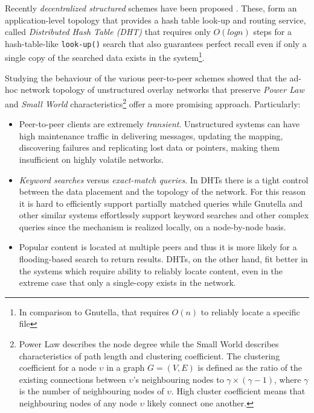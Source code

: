 \documentclass[a4paper,10pt]{article}
\begin{document}
Recently \emph{decentralized structured} schemes have been proposed \cite{ratnasamy_can_2001, stoica_chord_2001, zhao_tapestry_2001, antony_pastry_2001}. These, form an application-level topology that provides a hash table look-up and routing service, called \emph{Distributed Hash Table (DHT)} that requires only $O \left ( log n \right )$ steps for a hash-table-like \texttt{look-up()} search that also guarantees perfect recall even if only a single copy of the searched data exists in the system\footnote{In comparison to Gnutella, that requires $O \left ( n \right )$ to reliably locate a specific file}.

Studying the behaviour of the various peer-to-peer schemes \cite{matei_mapgnutella_2002, lv_randomwalks_2002, merugu_str2unstr_2003} showed that the ad-hoc network topology of unstructured overlay networks that preserve \emph{Power Law} and \emph{Small World} characteristics\footnote{Power Law describes the node degree while the Small World describes characteristics of path length and clustering coefficient. The clustering coefficient for a node $\upsilon$ in a graph $G = \left( V, E \right)$ is defined as the ratio of the existing connections between $\upsilon$'s neighbouring nodes to $\gamma \times \left( \gamma - 1 \right)$, where $\gamma$ is the number of neighbouring nodes of $\upsilon$. High cluster coefficient means that neighbouring nodes of any node $\upsilon$ likely connect one another.} \cite{faloutsos_powerlaw_1999, saroiu_measurefileshare_2002} offer a more promising approach. Particularly:
\begin{itemize}
  \item Peer-to-peer clients are extremely \emph{transient}. Unstructured systems can have high maintenance traffic in delivering messages, updating the mapping, discovering failures and replicating lost data or pointers, making them insufficient on highly volatile networks.
  \item \emph{Keyword searches} versus \emph{exact-match queries}. In DHTs there is a tight control between the data placement and the topology of the network. For this reason it is hard to efficiently support partially matched queries while Gnutella and other similar systems effortlessly support keyword searches and other complex queries since the mechanism is realized locally, on a node-by-node basis.
  \item Popular content is located at multiple peers and thus it is more likely for a flooding-based search to return results. DHTs, on the other hand, fit better in the systems which require ability to reliably locate content, even in the extreme case that only a single-copy exists in the network.
\end{itemize}
\end{document}
